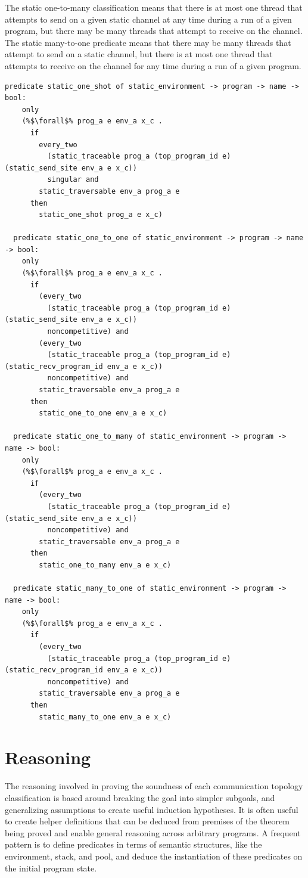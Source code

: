 \documentclass{article}
\begin{document}
The static one-to-many classification means that there is at most one thread that attempts to
send on a given static channel at any time during a run of a given program, but there may be
many threads that attempt to receive on the channel. The static many-to-one predicate means
that there may be many threads that attempt to send on a static channel, but there is at most
one thread that attempts to receive on the channel for any time during a run of a given
program.

\begin{lstlisting}[language=logic, escapechar=\%]
  predicate static_one_shot of static_environment -> program -> name -> bool:
    only
    (%$\forall$% prog_a e env_a x_c .
      if
        every_two
          (static_traceable prog_a (top_program_id e) (static_send_site env_a e x_c))
          singular and
        static_traversable env_a prog_a e
      then
        static_one_shot prog_a e x_c)

  predicate static_one_to_one of static_environment -> program -> name -> bool:
    only
    (%$\forall$% prog_a e env_a x_c .
      if
        (every_two
          (static_traceable prog_a (top_program_id e) (static_send_site env_a e x_c))
          noncompetitive) and 
        (every_two
          (static_traceable prog_a (top_program_id e) (static_recv_program_id env_a e x_c))
          noncompetitive) and 
        static_traversable env_a prog_a e
      then
        static_one_to_one env_a e x_c)

  predicate static_one_to_many of static_environment -> program -> name -> bool:
    only
    (%$\forall$% prog_a e env_a x_c .
      if
        (every_two
          (static_traceable prog_a (top_program_id e) (static_send_site env_a e x_c))
          noncompetitive) and
        static_traversable env_a prog_a e
      then
        static_one_to_many env_a e x_c) 

  predicate static_many_to_one of static_environment -> program -> name -> bool:
    only
    (%$\forall$% prog_a e env_a x_c .
      if
        (every_two
          (static_traceable prog_a (top_program_id e) (static_recv_program_id env_a e x_c))
          noncompetitive) and
        static_traversable env_a prog_a e
      then
        static_many_to_one env_a e x_c) 
\end{lstlisting}

\section{Reasoning}
The reasoning involved in proving the soundness of each communication topology classification
is based around breaking the goal into simpler subgoals, and generalizing assumptions to create
useful induction hypotheses.  It is often useful to
create helper definitions that can be deduced
from premises of the theorem being proved and enable
general reasoning across arbitrary programs.
A frequent pattern is to define
predicates in terms of semantic structures, like the environment, stack, and pool, and deduce 
the instantiation of these predicates on the initial program state. 
\end{document}
